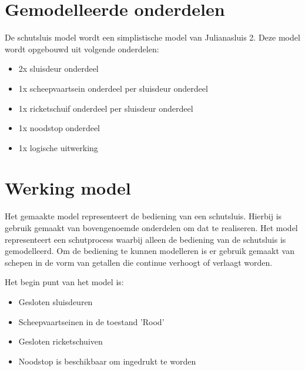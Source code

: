 \documentclass{article}
\begin{document}

\newpage
\section {Gemodelleerde onderdelen}
    De schutsluis model wordt een simplistische model van Julianasluis 2. Deze model
    wordt opgebouwd uit volgende onderdelen:

    \begin{itemize}
        \item 2x sluisdeur onderdeel
        \item 1x scheepvaartsein onderdeel per sluisdeur onderdeel
        \item 1x ricketschuif onderdeel per sluisdeur onderdeel
        \item 1x noodstop onderdeel
        \item 1x logische uitwerking
    \end{itemize}



\newpage
\section {Werking model}
\noindent
{}

Het gemaakte model representeert de bediening van een schutsluis. Hierbij is gebruik
gemaakt van bovengenoemde onderdelen om dat te realiseren. Het model representeert
een schutprocess waarbij alleen de bediening van de schutsluis is gemodelleerd. Om de
bediening te kunnen modelleren is er gebruik gemaakt van schepen in de vorm van 
getallen die continue verhoogt of verlaagt worden.

\noindent Het begin punt van het model is: 
    \begin{itemize}
        \item Gesloten sluisdeuren
        \item Scheepvaartseinen in de toestand 'Rood'
        \item Gesloten ricketschuiven
        \item Noodstop is beschikbaar om ingedrukt te worden
    \end{itemize}
\end{document}
